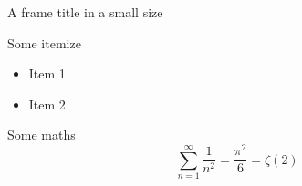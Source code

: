 \documentclass{beamer}
\begin{document}
\begin{frame}{A frame title in a small size}
 \begin{block}{Some itemize}
  \begin{itemize}
   \item Item 1
   \item Item 2
  \end{itemize}
 \end{block}
 \begin{block}{Some maths}
 \[\sum_{n=1}^{\infty}\frac{1}{n^2}=\frac{\pi^2}{6}=\zeta(2)\]
\end{block}
\end{frame}
\end{document}
